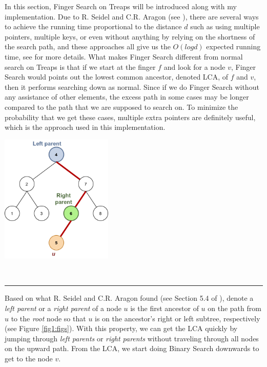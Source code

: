 \documentclass[12pt,english,]{article}
\let\origfigure\figure
\let\endorigfigure\endfigure
\renewenvironment{figure}[1][2] {
    \expandafter\origfigure\expandafter[H]
} {
    \endorigfigure
}
\begin{document}
In this section, Finger Search on Treaps will be introduced along with
my implementation. Due to R. Seidel and C.R. Aragon (see \cite{1}),
there are several ways to achieve the running time proportional to the
distance \(d\) such as using multiple pointers, multiple keys, or even
without anything by relying on the shortness of the search path, and
these approaches all give us the \(O(logd)\) expected running time, see
\cite{1} for more details. What makes Finger Search different from
normal search on Treaps is that if we start at the finger \(f\) and look
for a node \(v\), Finger Search would points out the lowest common
ancestor, denoted LCA, of \(f\) and \(v\), then it performs searching
down as normal. Since if we do Finger Search without any assistance of
other elements, the excess path in some cases may be longer compared to
the path that we are supposed to search on. To minimize the probability
that we get these cases, multiple extra pointers are definitely useful,
which is the approach used in this implementation.

\begin{figure}
\centering
\vspace{1mm}
\includegraphics[width=0.4\textwidth]{tree.png}
\caption{\label{fig1:figs}Visualization of \textit{left parent} and \textit{right parent} of a node $u$ in a binary tree.}

\  
\hrule
\end{figure}

Based on what R. Seidel and C.R. Aragon found (see Section 5.4 of
\cite{1}), denote a \emph{left parent} or a \emph{right parent} of a
node \(u\) is the first ancestor of \(u\) on the path from \(u\) to the
\emph{root} node so that \(u\) is on the ancestor's right or left
subtree, respectively (see Figure \ref{fig1:figs}). With this property,
we can get the LCA quickly by jumping through \emph{left parents} or
\emph{right parents} without traveling through all nodes on the upward
path. From the LCA, we start doing Binary Search downwards to get to the
node \(v\).
\end{document}
